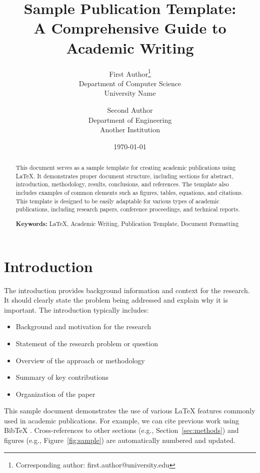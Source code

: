\documentclass[12pt,a4paper]{article}
\title{Sample Publication Template: \\
       A Comprehensive Guide to Academic Writing}
\author{
    First Author\thanks{Corresponding author: first.author@university.edu} \\
    Department of Computer Science \\
    University Name \\
    \and
    Second Author \\
    Department of Engineering \\
    Another Institution
}
\date{\today}
\begin{document}
\maketitle

\begin{abstract}
This document serves as a sample template for creating academic publications using \LaTeX{}. It demonstrates proper document structure, including sections for abstract, introduction, methodology, results, conclusions, and references. The template also includes examples of common elements such as figures, tables, equations, and citations. This template is designed to be easily adaptable for various types of academic publications, including research papers, conference proceedings, and technical reports.

\noindent\textbf{Keywords:} LaTeX, Academic Writing, Publication Template, Document Formatting
\end{abstract}

\newpage

\tableofcontents
\newpage

\section{Introduction}
\label{sec:introduction}

The introduction provides background information and context for the research. It should clearly state the problem being addressed and explain why it is important. The introduction typically includes:

\begin{itemize}
    \item Background and motivation for the research
    \item Statement of the research problem or question
    \item Overview of the approach or methodology
    \item Summary of key contributions
    \item Organization of the paper
\end{itemize}

This sample document demonstrates the use of various \LaTeX{} features commonly used in academic publications. For example, we can cite previous work using BibTeX \cite{knuth1984texbook, lamport1994latex}. Cross-references to other sections (e.g., Section~\ref{sec:methods}) and figures (e.g., Figure~\ref{fig:sample}) are automatically numbered and updated.
\end{document}
